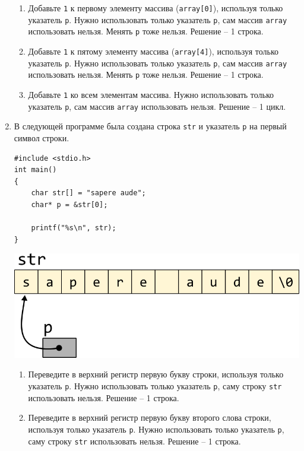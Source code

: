 \documentclass{article}
\begin{document}
\begin{enumerate}
\begin{enumerate}
\item Добавьте \texttt{1} к первому элементу массива (\texttt{array[0]}), используя только указатель \texttt{p}. Нужно использовать только указатель \texttt{p}, сам массив \texttt{array} использовать нельзя. Менять \texttt{p} тоже нельзя. Решение -- 1 строка.
\item Добавьте \texttt{1} к пятому элементу массива (\texttt{array[4]}), используя только указатель \texttt{p}. Нужно использовать только указатель \texttt{p}, сам массив \texttt{array} использовать нельзя. Менять \texttt{p} тоже нельзя. Решение -- 1 строка.
\item Добавьте \texttt{1} ко всем элементам массива. Нужно использовать только указатель \texttt{p}, сам массив \texttt{array} использовать нельзя. Решение -- 1 цикл.
\end{enumerate}



\newpage


\item В следующей программе была создана строка \texttt{str} и указатель \texttt{p} на первый символ строки. 
\begin{multicols}{2}
\begin{lstlisting}
#include <stdio.h>
int main() 
{
    char str[] = "sapere aude";
    char* p = &str[0];

    printf("%s\n", str);
}
\end{lstlisting}
\vfill \null    
\columnbreak
\vfill \null 
\begin{center}
\vspace{1cm} 
\includegraphics[scale=0.8]{../images/pointer_schemes/pointer_to_char_array.png}
\end{center}
\end{multicols}

\begin{enumerate}
\item Переведите в верхний регистр первую букву строки, используя только указатель \texttt{p}. Нужно использовать только указатель \texttt{p}, саму строку \texttt{str} использовать нельзя. Решение -- 1 строка.
\item Переведите в верхний регистр первую букву второго слова строки, используя только указатель \texttt{p}. Нужно использовать только указатель \texttt{p}, саму строку \texttt{str} использовать нельзя. Решение -- 1 строка.


\end{enumerate}
\end{enumerate}
\end{document}
